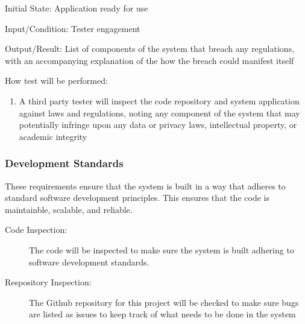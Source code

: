 \documentclass[12pt, titlepage]{article}
\begin{document}
\begin{enumerate}
  Initial State: Application ready for use

  Input/Condition: Tester engagement
  
  Output/Result: List of components of the system that breach any regulations, with an accompanying explanation of the how the breach could manifest itself

  How test will be performed:
  \begin{enumerate}
    \item A third party tester will inspect the code repository and system application against laws and regulations, noting any component of the system that may potentially infringe upon any data or privacy laws, intellectual property, or academic integrity
  \end{enumerate}
\end{enumerate}

\subsubsection{Development Standards}
These requirements ensure that the system is built in a way that adheres to
standard software development principles. This ensures that the code is
maintainble, scalable, and reliable.

\begin{description}
  \item[Code Inspection:] The code will be inspected to make sure the system is
  built adhering to software development standards.
  \item[Respository Inspection:] The Github repository for this project will be
  checked to make sure bugs are listed as issues to keep track of what needs to
  be done in the system 
\end{description}
\end{document}
